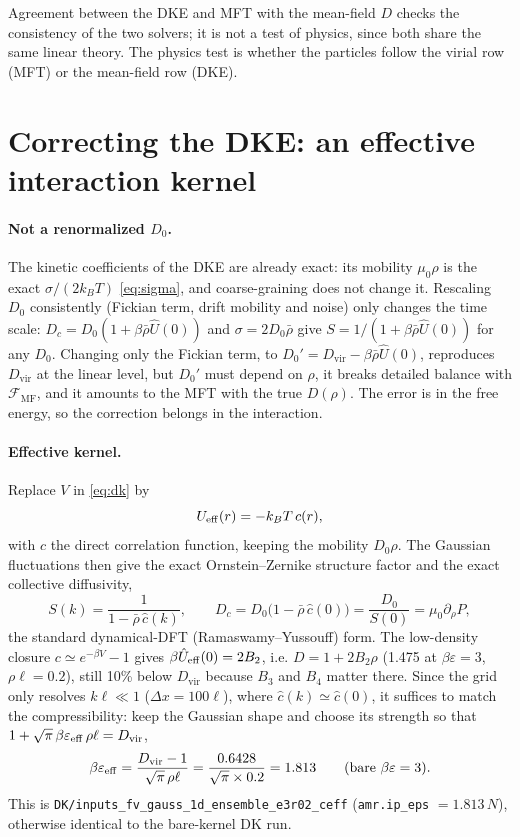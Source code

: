 \documentclass[11pt]{article}
\newcommand{\code}[1]{\texttt{#1}}
\newcommand{\Uh}{\hat U}
\newcommand{\MF}{\mathrm{MF}}
\newcommand{\vir}{\mathrm{vir}}
\begin{document}
\noindent Agreement between the DKE and MFT with the mean-field $D$ checks the
consistency of the two solvers; it is not a test of physics, since both share
the same linear theory. The physics test is whether the particles follow the
virial row (MFT) or the mean-field row (DKE).

\section{Correcting the DKE: an effective interaction kernel}\label{sec:ceff}

\paragraph{Not a renormalized $D_0$.} The kinetic coefficients of the DKE are
already exact: its mobility $\mu_0\rho$ is the exact $\sigma/(2k_BT)$
\eqref{eq:sigma}, and coarse-graining does not change it. Rescaling $D_0$
consistently (Fickian term, drift mobility and noise) only changes the time
scale: $D_c = D_0(1+\beta\bar\rho\Uh(0))$ and $\sigma = 2D_0\bar\rho$ give
$S = 1/(1+\beta\bar\rho\Uh(0))$ for any $D_0$. Changing only the Fickian term,
to $D_0' = D_\vir - \beta\bar\rho\Uh(0)$, reproduces $D_\vir$ at the linear
level, but $D_0'$ must depend on $\rho$, it breaks detailed balance with
$\mathcal F_\MF$, and it amounts to the MFT with the true $D(\rho)$. The error
is in the free energy, so the correction belongs in the interaction.

\paragraph{Effective kernel.} Replace $V$ in \eqref{eq:dk} by
\begin{equation}\label{eq:ueff}
  U_{\rm eff}(r) = -k_BT\,c(r),
\end{equation}
with $c$ the direct correlation function, keeping the mobility $D_0\rho$. The
Gaussian fluctuations then give the exact Ornstein--Zernike structure factor
and the exact collective diffusivity,
\begin{equation}
  S(k) = \frac{1}{1-\bar\rho\,\hat c(k)}, \qquad
  D_c = D_0\big(1-\bar\rho\,\hat c(0)\big) = \frac{D_0}{S(0)} = \mu_0\partial_\rho P ,
\end{equation}
the standard dynamical-DFT (Ramaswamy--Yussouff) form. The low-density
closure $c\simeq e^{-\beta V}-1$ gives $\beta\hat U_{\rm eff}(0) = 2B_2$, i.e.
$D = 1+2B_2\rho$ (1.475 at $\beta\varepsilon=3$, $\rho\ell=0.2$), still 10\%
below $D_\vir$ because $B_3$ and $B_4$ matter there. Since the grid only
resolves $k\ell\ll1$ ($\Delta x = 100\ell$), where $\hat c(k)\simeq\hat c(0)$,
it suffices to match the compressibility: keep the Gaussian shape and choose
its strength so that $1+\sqrt\pi\,\beta\varepsilon_{\rm eff}\,\rho\ell = D_\vir$,
\begin{equation}
  \beta\varepsilon_{\rm eff} = \frac{D_\vir-1}{\sqrt\pi\,\rho\ell}
   = \frac{0.6428}{\sqrt\pi\times0.2} = 1.813
   \qquad(\text{bare } \beta\varepsilon = 3).
\end{equation}
This is \code{DK/inputs\_fv\_gauss\_1d\_ensemble\_e3r02\_ceff}
(\code{amr.ip\_eps} $=1.813\,N$), otherwise identical to the bare-kernel DK run.
\end{document}
